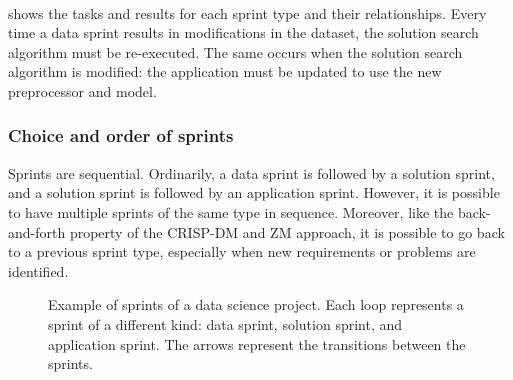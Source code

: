 \paragraph{}
 shows the tasks and results for each sprint type and their
relationships.  Every time a data sprint results in modifications in the dataset, the
solution search algorithm must be re-executed.  The same occurs when the solution search
algorithm is modified: the application must be updated to use the new preprocessor
and model.

\subsubsection{Choice and order of sprints}

Sprints are sequential.  Ordinarily, a data sprint is followed by a solution sprint, and a
solution sprint is followed by an application sprint.  However, it is possible to have
multiple sprints of the same type in sequence.  Moreover, like the back-and-forth property of the CRISP-DM
and ZM approach, it is possible to go back to a previous sprint type, especially
when new requirements or problems are identified.

\begin{figure}
  \centering
  \caption{
  Example of sprints of a data science project.
  Each loop represents a sprint of a different kind: data sprint, solution sprint, and
  application sprint.  The arrows represent the transitions between the sprints.
  }
  \label{fig:sprints}
\end{figure}

